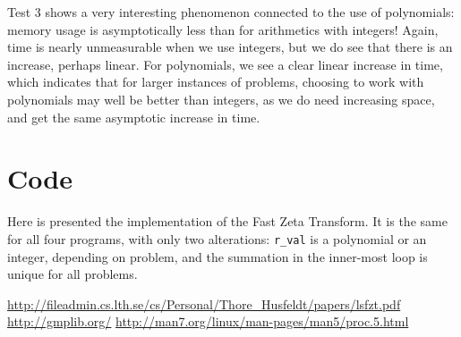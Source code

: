 \documentclass[a4paper, titlepage]{article}
\newcommand{\code}{\texttt}
\begin{document}
Test 3 shows a very interesting phenomenon connected to the use of polynomials: memory usage is asymptotically less than for arithmetics with integers! Again, time is nearly unmeasurable when we use integers, but we do see that there is an increase, perhaps linear. For polynomials, we see a clear linear increase in time, which indicates that for larger instances of problems, choosing to work with polynomials may well be better than integers, as we do need increasing space, and get the same asymptotic increase in time.

\section{Code}
Here is presented the implementation of the Fast Zeta Transform. It is the same for all four programs, with only two alterations: \code{r\_val} is a polynomial or an integer, depending on problem, and the summation in the inner-most loop is unique for all problems.


\begin{thebibliography}{9}
 \url{http://fileadmin.cs.lth.se/cs/Personal/Thore_Husfeldt/papers/lsfzt.pdf}
 \url{http://gmplib.org/}
 \url{http://man7.org/linux/man-pages/man5/proc.5.html}
\end{thebibliography}
\end{document}
